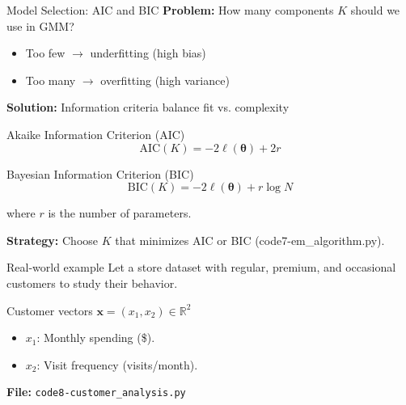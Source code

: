 \documentclass{beamer}
\newcommand{\x}{\mathbf{x}}
\newcommand{\btheta}{\boldsymbol{\theta}}
\begin{document}
\begin{frame}{Model Selection: AIC and BIC}
\textbf{Problem:} How many components $K$ should we use in GMM?
\begin{itemize}
\item Too few $\rightarrow$ \alert{underfitting} (high bias)
\item Too many $\rightarrow$ \alert{overfitting} (high variance)
\end{itemize}
\vspace{0.3cm}\pause

\textbf{Solution:} Information criteria balance fit vs. complexity
\begin{block}{Akaike Information Criterion (AIC)}
$$\text{AIC}(K) = -2\ell(\btheta) + 2r$$
\end{block}
\begin{block}{Bayesian Information Criterion (BIC)}
$$\text{BIC}(K) = -2\ell(\btheta) + r \log N$$
\end{block}
where $r$ is the number of parameters.
\pause

\textbf{Strategy:} Choose $K$ that \alert{minimizes} AIC or BIC (code7-em\_algorithm.py).
\end{frame}

\begin{frame}{Real-world example}
  Let a store dataset with regular, premium, and occasional customers
  to study their behavior.
\vspace{0.5cm}\\
\begin{block}{Customer vectors $\x = (x_1, x_2) \in \mathbb{R}^2$}
    \vspace{0.5cm}
  \begin{itemize}
  \item $x_1$: Monthly spending (\$).
    \vspace{0.5cm}
  \item $x_2$: Visit frequency (visits/month).
  \end{itemize}
  \end{block}
  \vspace{1cm}
  \textbf{File:} \texttt{code8-customer\_analysis.py}
  
\end{frame}
\end{document}
